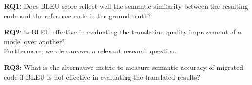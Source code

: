 {\bf RQ1:} Does BLEU score reflect well the semantic similarity between
the resulting code and the reference code in the ground truth?

{\bf RQ2:} Is BLEU effective in evaluating the translation quality 
improvement of a model over another?\\
Furthermore, we also answer a relevant research question:

{\bf RQ3:} What is the alternative metric to measure semantic accuracy
of migrated code if BLEU is not effective in evaluating the translated results?